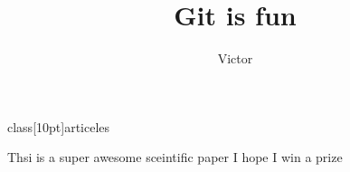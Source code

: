  \document class[10pt]{articeles}
\author { Victor}
\title{Git is fun}

      \maketiitle

      Thsi is a super awesome sceintific paper
      I hope I win a prize

